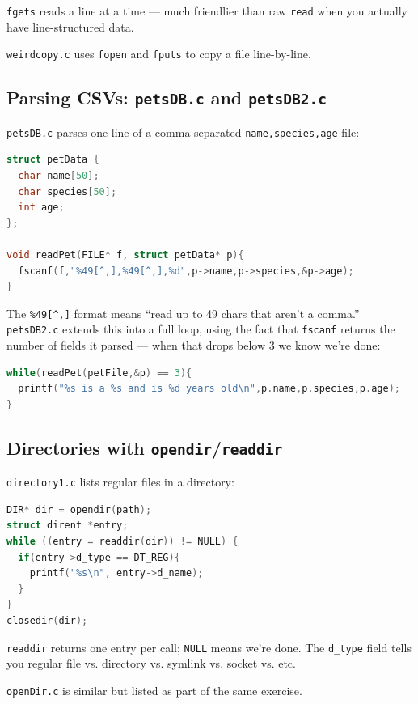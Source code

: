 \documentclass[11pt]{article}
\begin{document}
\texttt{fgets} reads a line at a time --- much friendlier than
raw \texttt{read} when you actually have line-structured data.

\texttt{weirdcopy.c} uses \texttt{fopen} and \texttt{fputs} to copy
a file line-by-line.

\subsection*{Parsing CSVs: \texttt{petsDB.c} and \texttt{petsDB2.c}}

\texttt{petsDB.c} parses one line of a comma-separated
\texttt{name,species,age} file:

\begin{lstlisting}[language=C]
struct petData {
  char name[50];
  char species[50];
  int age;
};

void readPet(FILE* f, struct petData* p){
  fscanf(f,"%49[^,],%49[^,],%d",p->name,p->species,&p->age);
}
\end{lstlisting}

The \texttt{\%49[\^{},]} format means ``read up to 49 chars that
aren't a comma.'' \texttt{petsDB2.c} extends this into a full
loop, using the fact that \texttt{fscanf} returns the number of
fields it parsed --- when that drops below 3 we know we're done:

\begin{lstlisting}[language=C]
while(readPet(petFile,&p) == 3){
  printf("%s is a %s and is %d years old\n",p.name,p.species,p.age);
}
\end{lstlisting}

\subsection*{Directories with \texttt{opendir}/\texttt{readdir}}

\texttt{directory1.c} lists regular files in a directory:

\begin{lstlisting}[language=C]
DIR* dir = opendir(path);
struct dirent *entry;
while ((entry = readdir(dir)) != NULL) {
  if(entry->d_type == DT_REG){
    printf("%s\n", entry->d_name);
  }
}
closedir(dir);
\end{lstlisting}

\texttt{readdir} returns one entry per call; \texttt{NULL} means
we're done. The \texttt{d\_type} field tells you regular file vs.
directory vs. symlink vs. socket vs. etc.

\texttt{openDir.c} is similar but listed as part of the same
exercise.
\end{document}
